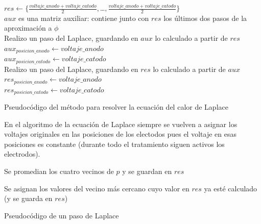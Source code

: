 \documentclass[a4paper]{article}
\begin{document}
\begin{algorithm}[H]
\DontPrintSemicolon
	$res \leftarrow \Big \{\frac{voltaje\_anodo + voltaje\_catodo}{2}, $\ldots$ , \frac{voltaje\_anodo + voltaje\_catodo}{2} \Big \}$ \\
	$aux$ es una matriz auxiliar: contiene junto con $res$ los últimos dos pasos de la aproximación a $\phi$ \\

	 {
		Realizo un paso del Laplace, guardando en $aux$ lo calculado a partir de $res$ \\
		$aux_{posicion\_anodo} \leftarrow voltaje\_anodo$ \\
		$aux_{posicion\_catodo} \leftarrow voltaje\_catodo$ \\
		\;
		Realizo un paso del Laplace, guardando en $res$ lo calculado a partir de $aux$ \\
		$res_{posicion\_anodo} \leftarrow voltaje\_anodo$ \\
		$res_{posicion\_catodo} \leftarrow voltaje\_catodo$ \\	
	}

\caption{Pseudocódigo del método para resolver la ecuación del calor de Laplace}
\end{algorithm}

\bigskip
En el algoritmo de la ecuación de Laplace siempre se vuelven a asignar 
los voltajes originales en las posiciones de 
los electodos pues el voltaje en esas posiciones es constante (durante todo el tratamiento
siguen activos los electrodos). \\

\begin{algorithm}[H]
\DontPrintSemicolon
	 {
		Se promedian los cuatro vecinos de $p$ y se guardan en $res$
	}
	
	 {
		Se asignan los valores del vecino más cercano cuyo valor en $res$ ya esté calculado (y se guarda en $res$)
	}

\caption{Pseudocódigo de un paso de Laplace}
\end{algorithm}
\end{document}
